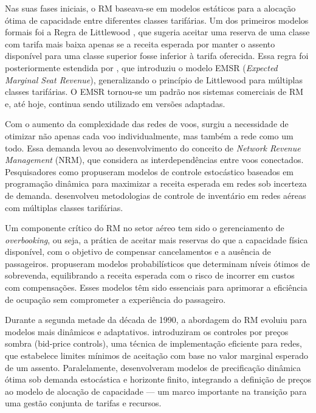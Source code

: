 Nas suas fases iniciais, o RM baseava-se em modelos estáticos para a alocação ótima de capacidade entre diferentes classes tarifárias. Um dos primeiros modelos formais foi a Regra de Littlewood \citep{article_YM_to_RM}, que sugeria aceitar uma reserva de uma classe com tarifa mais baixa apenas se a receita esperada por manter o assento disponível para uma classe superior fosse inferior à tarifa oferecida. Essa regra foi posteriormente estendida por \citet{Belobaba1987}, que introduziu o modelo EMSR (\textit{Expected Marginal Seat Revenue}), generalizando o princípio de Littlewood para múltiplas classes tarifárias. O EMSR tornou-se um padrão nos sistemas comerciais de RM e, até hoje, continua sendo utilizado em versões adaptadas.

Com o aumento da complexidade das redes de voos, surgiu a necessidade de otimizar não apenas cada voo individualmente, mas também a rede como um todo. Essa demanda levou ao desenvolvimento do conceito de \textit{Network Revenue Management} (NRM), que considera as interdependências entre voos conectados. Pesquisadores como \citet{Gallego_Ryzin1997} propuseram modelos de controle estocástico baseados em programação dinâmica para maximizar a receita esperada em redes sob incerteza de demanda. \citet{Williamson1992AirlineNS} desenvolveu metodologias de controle de inventário em redes aéreas com múltiplas classes tarifárias.

Um componente crítico do RM no setor aéreo tem sido o gerenciamento de \textit{overbooking}, ou seja, a prática de aceitar mais reservas do que a capacidade física disponível, com o objetivo de compensar cancelamentos e a ausência de passageiros. \citet{Brumelle_1993} propuseram modelos probabilísticos que determinam níveis ótimos de sobrevenda, equilibrando a receita esperada com o risco de incorrer em custos com compensações. Esses modelos têm sido essenciais para aprimorar a eficiência de ocupação sem comprometer a experiência do passageiro.

Durante a segunda metade da década de 1990, a abordagem do RM evoluiu para modelos mais dinâmicos e adaptativos. \citet{Talluri_Ryzin1998} introduziram os controles por preços sombra (bid-price controls), uma técnica de implementação eficiente para redes, que estabelece limites mínimos de aceitação com base no valor marginal esperado de um assento. Paralelamente, \citet{Gallego1994} desenvolveram modelos de precificação dinâmica ótima sob demanda estocástica e horizonte finito, integrando a definição de preços ao modelo de alocação de capacidade — um marco importante na transição para uma gestão conjunta de tarifas e recursos.

